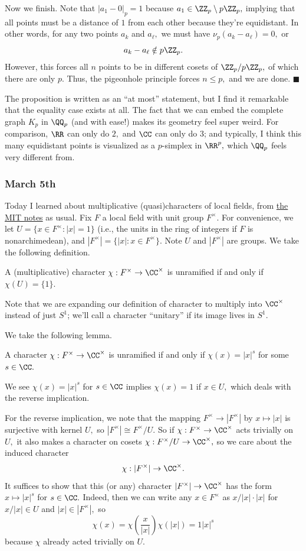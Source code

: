 Now we finish. Note that $|a_1-0|_p=1$ because $a_1\in\ZZ_p\setminus p\ZZ_p,$ implying that all points must be a distance of $1$ from each other because they're equidistant. In other words, for any two points $a_k$ and $a_\ell,$ we must have $\nu_p(a_k-a_\ell)=0,$ or
\[a_k-a_\ell\notin p\ZZ_p.\]
However, this forces all $n$ points to be in different cosets of $\ZZ_p/p\ZZ_p,$ of which there are only $p.$ Thus, the pigeonhole principle forces $n\le p,$ and we are done. $\blacksquare$

The proposition is written as an ``at most'' statement, but I find it remarkable that the equality case exists at all. The fact that we can embed the complete graph $K_p$ in $\QQ_p$ (and with ease!) makes its geometry feel super weird. For comparison, $\RR$ can only do $2,$ and $\CC$ can only do $3$; and typically, I think this many equidistant points is visualized as a $p$-simplex in $\RR^p,$ which $\QQ_p$ feels very different from.

\subsubsection{March 5th}
Today I learned about multiplicative (quasi)characters of local fields, from \href{http://math.mit.edu/~poonen/786/notes.pdf}{the MIT notes} as usual. Fix $F$ a local field with unit group $F^\times.$ For convenience, we let $U=\{x\in F^\times:|x|=1\}$ (i.e., the units in the ring of integers if $F$ is nonarchimedean), and $|F^\times|=\{|x|:x\in F^\times\}.$ Note $U$ and $|F^\times|$ are groups. We take the following definition.
\begin{definition}
    A (multiplicative) character $\chi:F^\times\to\CC^\times$ is unramified if and only if $\chi(U)=\{1\}.$
\end{definition}
Note that we are expanding our definition of character to multiply into $\CC^\times$ instead of just $S^1$; we'll call a character ``unitary'' if its image lives in $S^1.$

We take the following lemma.
\begin{lemma}
    A character $\chi:F^\times\to\CC^\times$ is unramified if and only if $\chi(x)=|x|^s$ for some $s\in\CC.$
\end{lemma}
We see $\chi(x)=|x|^s$ for $s\in\CC$ implies $\chi(x)=1$ if $x\in U,$ which deals with the reverse implication.

For the reverse implication, we note that the mapping $F^\times\to|F^\times|$ by $x\mapsto|x|$ is surjective with kernel $U,$ so $|F^\times|\cong F^\times/U.$ So if $\chi:F^\times\to\CC^\times$ acts trivially on $U,$ it also makes a character on cosets $\chi:F^\times/U\to\CC^\times,$ so we care about the induced character
\[\chi:|F^\times|\to\CC^\times.\]
It suffices to show that this (or any) character $|F^\times|\to\CC^\times$ has the form $x\mapsto|x|^s$ for $s\in\CC.$ Indeed, then we can write any $x\in F^\times$ as $x/|x|\cdot|x|$ for $x/|x|\in U$ and $|x|\in|F^\times|,$ so
\[\chi(x)=\chi\left(\frac x{|x|}\right)\chi(|x|)=1|x|^s\]
because $\chi$ already acted trivially on $U.$

